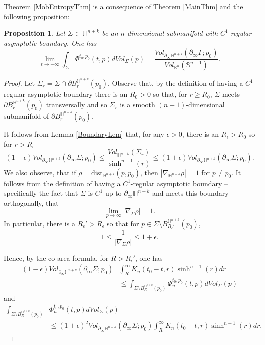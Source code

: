 \documentclass{amsart}
\newtheorem{prop}[thm]{Proposition}
\theoremstyle{definition}
\theoremstyle{remark}
\numberwithin{equation}{section}
\newcommand{\Real}{\mathbb R}
\newcommand{\dist}[0]{\mathrm{dist}}
\begin{document}
Theorem \ref{MobEntropyThm} is a consequence of Theorem \ref{MainThm} and the following proposition:
\begin{prop}\label{LimitProp}
Let $\Sigma\subset \mathbb{H}^{n+k}$ be an $n$-dimensional submanifold with $C^1$-regular asymptotic boundary. 
One has
$$
\lim_{t\to -\infty} \int_{\Sigma} \Phi^{t_0, p_0} (t,p) dVol_{\Sigma}(p)=\frac{Vol_{\partial_\infty \mathbb{H}^{n+k}}(\partial_\infty \Gamma; p_0)}{Vol_{\Real^{n}}(\mathbb{S}^{n-1})}.
$$
\end{prop}
\begin{proof}
 Let $\Sigma_r=\Sigma\cap \partial B_{r}^{\mathbb{H}^{n+k}}(p_0)$.  Observe that, by the definition of having a $C^1$-regular asymptotic boundary there is an $R_0>0$ so that, for $r\geq R_0$, $\Sigma $ meets $\partial B_r^{\mathbb{H}^{n+k}}(p_0)$ transversally and so $\Sigma_r$ is a smooth $(n-1)$-dimensional submanifold of  $\partial B_r^{\mathbb{H}^{n+k}}(p_0)$.  
 
It follows from Lemma \ref{BoundaryLem} that, for any $\epsilon>0$, there is an $R_\epsilon>R_0$ so for $r>R_\epsilon$
 $$
 (1-\epsilon) { Vol_{\partial_\infty \mathbb{H}^{n+k}}(\partial_\infty \Sigma; p_0)}\leq  \frac{ Vol_{\mathbb{H}^{n+k}}(\Sigma_r)}{{\sinh^{n-1}(r)}}\leq (1+\epsilon) {Vol_{\partial_\infty \mathbb{H}^{n+k}}(\partial_\infty \Sigma; p_0)}.
 $$
 We also observe, that if $\rho=\dist_{\mathbb{H}^{n+k}}(p,p_0)$, then $|\nabla_{\mathbb{H}^{n+k}} \rho|=1$ for $p\neq p_0$.  It follows from the definition of having a $C^1$-regular asymptotic boundary -- specifically the fact that $\Sigma$ is $C^1$ up to $\partial_\infty \mathbb{H}^{n+k}$ and meets this boundary orthogonally, that
 $$
 \lim_{p\to \infty} |\nabla_\Sigma \rho|=1.
 $$
 In particular, there is a $R_\epsilon'>R_\epsilon$ so that for $p\in \Sigma\setminus B_{R_\epsilon'}^{\mathbb{H}^{n+k}}(p_0)$,
 $$
 1\leq \frac{1}{|\nabla_\Sigma \rho|}\leq 1+\epsilon.
 $$
 
 Hence, by the co-area formula, for $R>R_\epsilon'$, one has
 \begin{align*}
 (1-\epsilon) Vol_{\partial_\infty\mathbb{H}^{n+k}}(\partial_\infty \Sigma; p_0) &
 \int_R^\infty K_n(t_0-t, r)  \sinh^{n-1}(r) dr\\
 & \leq \int_{\Sigma\setminus B_R^{\mathbb{H}^{n+k}}(p_0)} \Phi_n^{t_0,p_0}(t,p) dVol_\Sigma(p)
\end{align*}
 and
\begin{align*}
 \int_{\Sigma\setminus B_R^{\mathbb{H}^{n+k}}(p_0)} & \Phi_n^{t_0,p_0}(t,p) dVol_\Sigma(p)\\
 &\leq   (1+\epsilon)^2 Vol_{\partial_\infty\mathbb{H}^{n+k}}(\partial_\infty \Sigma; p_0) \int_R^\infty K_n(t_0-t, r)  \sinh^{n-1}(r) dr.
\end{align*}
 

\end{proof}
\end{document}
